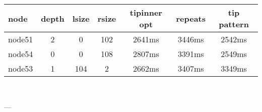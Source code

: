 

\begin{tabular}{|l|c|c|c|c|c|c|}
\hline node & depth & lsize & rsize  & tipinner opt & repeats & tip pattern\\
    \hline node51 & 2 & 0 & 102 & 2641ms & 3446ms & 2542ms\\
    \hline node54 & 0 & 0 & 108 & 2807ms & 3391ms & 2549ms\\
    \hline node53 & 1 & 104 & 2 & 2662ms & 3407ms & 3349ms\\

\hline
\end{tabular} \

---

